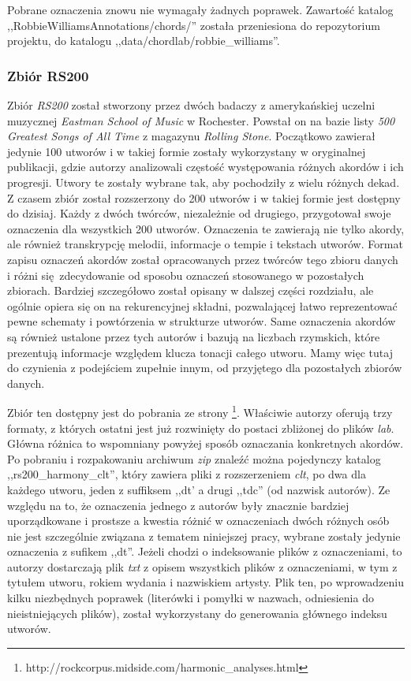 Pobrane oznaczenia znowu nie wymagały żadnych poprawek. Zawartość katalog
,,RobbieWilliamsAnnotations/chords/'' została przeniesiona do repozytorium projektu, do katalogu
,,data/chordlab/robbie\_williams''.

\subsubsection{Zbiór RS200}

Zbiór \emph{RS200} \cite{de_clercq_corpus_2011} został stworzony przez dwóch badaczy z amerykańskiej
uczelni muzycznej \emph{Eastman School of Music} w Rochester. Powstał on na bazie listy \emph{500
Greatest Songs of All Time} z magazynu \emph{Rolling Stone}. Początkowo zawierał jedynie 100 utworów i w
takiej formie zostały wykorzystany w oryginalnej publikacji, gdzie autorzy analizowali częstość
występowania różnych akordów i ich progresji. Utwory te zostały wybrane tak, aby pochodziły z wielu
różnych dekad. Z czasem zbiór został rozszerzony do 200 utworów i w takiej formie jest dostępny do
dzisiaj. Każdy z dwóch twórców, niezależnie od drugiego, przygotował swoje oznaczenia dla wszystkich
200 utworów. Oznaczenia te zawierają nie tylko akordy, ale również transkrypcję melodii, informacje
o tempie i tekstach utworów. Format zapisu oznaczeń akordów został opracowanych przez twórców tego
zbioru danych i różni się zdecydowanie od sposobu oznaczeń stosowanego w pozostałych zbiorach.
Bardziej szczegółowo został opisany w dalszej części rozdziału, ale ogólnie opiera się on na
rekurencyjnej składni, pozwalającej łatwo reprezentować pewne schematy i powtórzenia w strukturze
utworów. Same oznaczenia akordów są również ustalone przez tych autorów i bazują na liczbach
rzymskich, które prezentują informacje względem klucza tonacji całego utworu. Mamy więc tutaj do
czynienia z podejściem zupełnie innym, od przyjętego dla pozostałych zbiorów danych.

Zbiór ten dostępny jest do pobrania ze strony
\footnote{http://rockcorpus.midside.com/harmonic_analyses.html}. Właściwie autorzy oferują trzy
formaty, z których ostatni jest już rozwinięty do postaci zbliżonej do plików \emph{lab}. Główna
różnica to wspomniany powyżej sposób oznaczania konkretnych akordów. Po pobraniu i rozpakowaniu archiwum
\emph{zip} znaleźć można pojedynczy katalog ,,rs200_harmony_clt'', który zawiera pliki z
rozszerzeniem \emph{clt}, po dwa dla każdego utworu, jeden z suffiksem ,,dt' a drugi ,,tdc'' (od
nazwisk autorów). Ze względu na to, że oznaczenia jednego z autorów były znacznie bardziej
uporządkowane i prostsze a kwestia różnić w oznaczeniach dwóch różnych osób nie jest szczególnie
związana z tematem niniejszej pracy, wybrane zostały jedynie oznaczenia z sufikem ,,dt''. Jeżeli
chodzi o indeksowanie plików z oznaczeniami, to autorzy dostarczają plik \emph{txt} z opisem
wszystkich plików z oznaczeniami, w tym z tytułem utworu, rokiem wydania i nazwiskiem artysty. Plik
ten, po wprowadzeniu kilku niezbędnych poprawek (literówki i pomyłki w nazwach, odniesienia do
nieistniejących plików), został wykorzystany do generowania głównego indeksu utworów.

